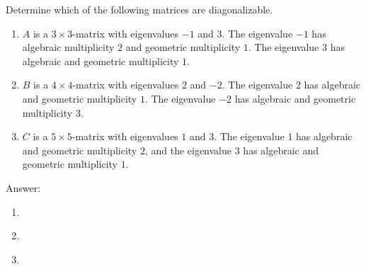 \documentclass{ximera}
\author{Zack Reed}
\begin{document}
\begin{problem}
  Determine which of the following matrices are diagonalizable.
  \begin{enumerate}
  \item $A$ is a $3\times 3$-matrix with eigenvalues $-1$ and $3$. The
    eigenvalue $-1$ has algebraic multiplicity $2$ and geometric
    multiplicity $1$. The eigenvalue $3$ has algebraic and geometric
    multiplicity $1$.
  \item $B$ is a $4\times 4$-matrix with eigenvalues $2$ and $-2$. The
    eigenvalue $2$ has algebraic and geometric multiplicity $1$. The
    eigenvalue $-2$ has algebraic and geometric multiplicity $3$.
  \item $C$ is a $5\times 5$-matrix with eigenvalues $1$ and $3$. The
    eigenvalue $1$ has algebraic and geometric multiplicity $2$, and
    the eigenvalue $3$ has algebraic and geometric multiplicity $1$.
  \end{enumerate}

  Answer:
  
      \begin{enumerate}
        \item \begin{multipleChoice}
        \end{multipleChoice}
        \item \begin{multipleChoice}
        \end{multipleChoice}
        \item \begin{multipleChoice}
        \end{multipleChoice}
    \end{enumerate}

\end{problem}
\end{document}
